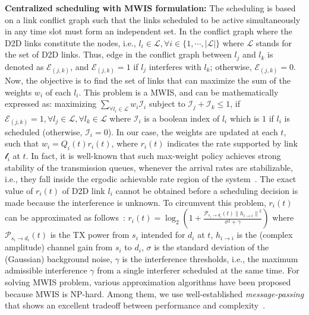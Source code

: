 \documentclass[journal]{IEEEtran}
\begin{document}
\textbf{Centralized scheduling with MWIS formulation:}
The scheduling is based on a link conflict graph such that the links scheduled to be active simultaneously in any time slot must form an independent set. In the conflict graph where the D2D links constitute the nodes, i.e., $l_{i}\in\mathcal{L}, \forall i\in\{1,\cdots,|\mathcal{L}|\}$ where $\mathcal{L}$ stands for the set of D2D links.
Thus, edge in the conflict graph between $l_{j}$ and $l_{k}$ is denoted as $\mathcal{E}_{(j,k)}$, and $\mathcal{E}_{(j,k)}=1$ if $l_{j}$ interferes with $l_{k}$; otherwise, $\mathcal{E}_{(j,k)}=0$.
Now, the objective is to find the set of links that can maximize the sum of the weights $w_{i}$ of each $l_{i}$.
This problem is a MWIS, and can be mathematically expressed as: maximizing $\sum_{\forall l_{i}\in\mathcal{L}}\nolimits w_{i}\mathcal{I}_{i}$ subject to $\mathcal{I}_{j} + \mathcal{I}_{k} \leq 1$, if $\mathcal{E}_{(j,k)}=1, \forall l_{j}\in\mathcal{L}, \forall l_{k}\in\mathcal{L}$
where $\mathcal{I}_{i}$ is a boolean index of $l_{i}$ which is $1$ if $l_{i}$ is scheduled (otherwise, $\mathcal{I}_{i}=0$). In our case, the weights are updated at each $t$, such that $w_{i} = Q_{i}(t) r_{i}(t)$, where $r_{i}(t)$ indicates the rate supported by link $\mathcal{l}_{i}$
at $t$. In fact, it is well-known that such max-weight policy achieves strong stability of the transmission queues, whenever the arrival rates are stabilizable, i.e., they fall inside the ergodic achievable rate region of the system~\cite{asilomar2012bethanabhotla}.
The exact value of $r_{i}(t)$ of D2D link $l_{i}$ cannot be obtained before a scheduling decision is made because the interference is unknown.
To circumvent this problem, $r_{i}(t)$ can be approximated as follows~\cite{jsac2011win}:
$r_{i}(t) = \log_{2}
\left(
    1+
    \frac{
        \mathcal{P}_{s_{i}\rightarrow d_{i}}(t)\left\|h_{i\rightarrow i}\right\|^{2}
    }{\sigma^{2} + \gamma}
\right)$
where
    $\mathcal{P}_{s_{i}\rightarrow d_{i}}(t)$ is the TX power from $s_{i}$ intended for $d_{i}$ at $t$,
    $h_{i\rightarrow i}$ is the (complex amplitude) channel gain from $s_{i}$ to $d_{i}$,
    $\sigma$ is the standard deviation of the (Gaussian) background noise,
    $\gamma$ is the interference thresholds, i.e., the maximum admissible interference $\gamma$ from a single interferer scheduled at the same time.
For solving MWIS problem, various approximation algorithms have been proposed because MWIS is NP-hard. Among them, we use well-established \textit{message-passing} that shows an excellent tradeoff between performance and complexity~\cite{tit2009sanghavi}.
\end{document}
